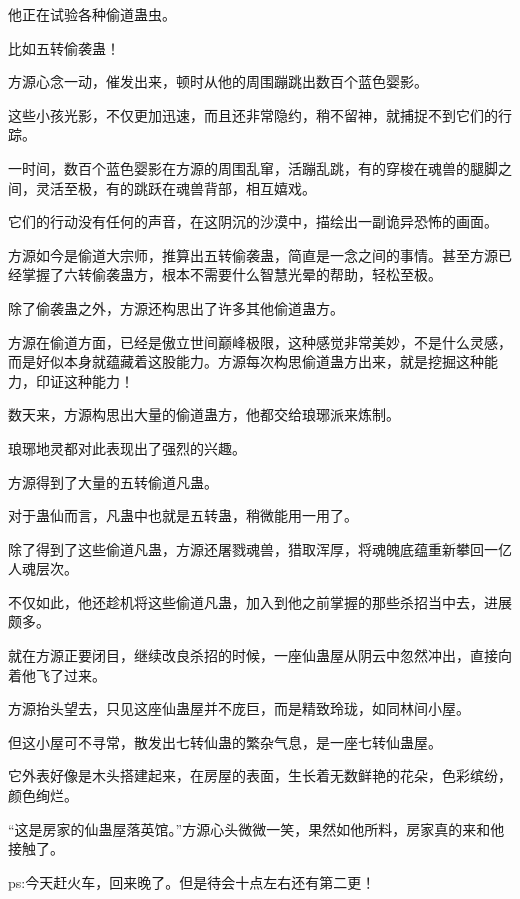 \begin{this_body}
他正在试验各种偷道蛊虫。

比如五转偷袭蛊！

方源心念一动，催发出来，顿时从他的周围蹦跳出数百个蓝色婴影。

这些小孩光影，不仅更加迅速，而且还非常隐约，稍不留神，就捕捉不到它们的行踪。

一时间，数百个蓝色婴影在方源的周围乱窜，活蹦乱跳，有的穿梭在魂兽的腿脚之间，灵活至极，有的跳跃在魂兽背部，相互嬉戏。

它们的行动没有任何的声音，在这阴沉的沙漠中，描绘出一副诡异恐怖的画面。

方源如今是偷道大宗师，推算出五转偷袭蛊，简直是一念之间的事情。甚至方源已经掌握了六转偷袭蛊方，根本不需要什么智慧光晕的帮助，轻松至极。

除了偷袭蛊之外，方源还构思出了许多其他偷道蛊方。

方源在偷道方面，已经是傲立世间巅峰极限，这种感觉非常美妙，不是什么灵感，而是好似本身就蕴藏着这股能力。方源每次构思偷道蛊方出来，就是挖掘这种能力，印证这种能力！

数天来，方源构思出大量的偷道蛊方，他都交给琅琊派来炼制。

琅琊地灵都对此表现出了强烈的兴趣。

方源得到了大量的五转偷道凡蛊。

对于蛊仙而言，凡蛊中也就是五转蛊，稍微能用一用了。

除了得到了这些偷道凡蛊，方源还屠戮魂兽，猎取浑厚，将魂魄底蕴重新攀回一亿人魂层次。

不仅如此，他还趁机将这些偷道凡蛊，加入到他之前掌握的那些杀招当中去，进展颇多。

就在方源正要闭目，继续改良杀招的时候，一座仙蛊屋从阴云中忽然冲出，直接向着他飞了过来。

方源抬头望去，只见这座仙蛊屋并不庞巨，而是精致玲珑，如同林间小屋。

但这小屋可不寻常，散发出七转仙蛊的繁杂气息，是一座七转仙蛊屋。

它外表好像是木头搭建起来，在房屋的表面，生长着无数鲜艳的花朵，色彩缤纷，颜色绚烂。

“这是房家的仙蛊屋落英馆。”方源心头微微一笑，果然如他所料，房家真的来和他接触了。

ps:今天赶火车，回来晚了。但是待会十点左右还有第二更！

\end{this_body}

